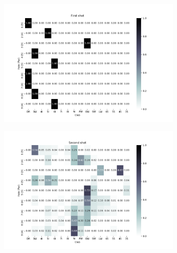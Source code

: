 \documentclass{kththesis}
\begin{document}
\begin{figure}
    \centering
    \begin{subfigure}{\textwidth}
    \centering
    \includegraphics[height=0.3\textheight]{AgentClubChoices/DDDQN_Ullna_Club_Choices_First_Shot.png} 
    \end{subfigure}
    \begin{subfigure}{\textwidth}
    \centering
    \includegraphics[height=0.3\textheight]{AgentClubChoices/DDDQN_Ullna_Club_Choices_Second_Shot.png} 
    \end{subfigure}
    \begin{subfigure}{\textwidth}
    \centering

\end{subfigure}
\end{figure}
\end{document}
